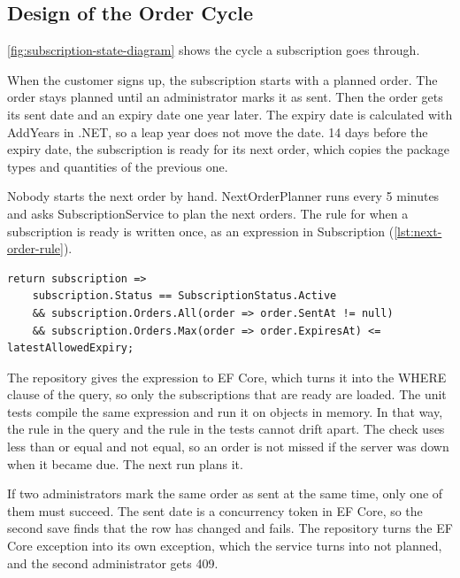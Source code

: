 \subsection{Design of the Order Cycle}

\autoref{fig:subscription-state-diagram} shows the cycle a subscription goes through.


When the customer signs up, the subscription starts with a planned order. The order
stays planned until an administrator marks it as sent. Then the order gets its sent date
and an expiry date one year later. The expiry date is calculated with AddYears in .NET,
so a leap year does not move the date. 14 days before the expiry date, the subscription
is ready for its next order, which copies the package types and quantities of the
previous one.

Nobody starts the next order by hand. NextOrderPlanner runs every 5 minutes and asks
SubscriptionService to plan the next orders. The rule for when a subscription is ready
is written once, as an expression in Subscription (\autoref{lst:next-order-rule}).

\begin{code}[H]
\begin{verbatim}
return subscription =>
    subscription.Status == SubscriptionStatus.Active
    && subscription.Orders.All(order => order.SentAt != null)
    && subscription.Orders.Max(order => order.ExpiresAt) <= latestAllowedExpiry;
\end{verbatim}
\caption{The rule for when the next order is due, from Subscription.}
\label{lst:next-order-rule}
\end{code}

The repository gives the expression to EF Core, which turns it into the WHERE clause of
the query, so only the subscriptions that are ready are loaded. The unit tests compile
the same expression and run it on objects in memory. In that way, the rule in the query
and the rule in the tests cannot drift apart. The check uses less than or equal and not
equal, so an order is not missed if the server was down when it became due. The next
run plans it.

If two administrators mark the same order as sent at the same time, only one of them
must succeed. The sent date is a concurrency token in EF Core, so the second save finds
that the row has changed and fails. The repository turns the EF Core exception into its
own exception, which the service turns into not planned, and the second administrator
gets 409.

